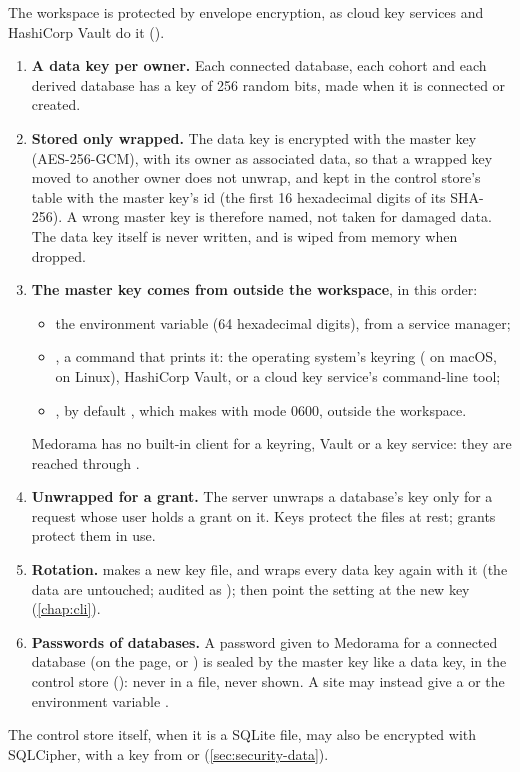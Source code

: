The workspace is protected by envelope encryption, as cloud key services and HashiCorp Vault do it
().
\begin{enumerate}
\item \textbf{A data key per owner.} Each connected database, each cohort and each derived
  database has a key of 256 random bits, made when it is connected or created.
\item \textbf{Stored only wrapped.} The data key is encrypted with the master key (AES-256-GCM),
  with its owner as associated data, so that a wrapped key moved to another owner does not
  unwrap, and kept in the control store's  table with the master key's id (the first 16
  hexadecimal digits of its SHA-256). A wrong master key is therefore named, not taken for
  damaged data. The data key itself is never written, and is wiped from memory when dropped.
\item \textbf{The master key comes from outside the workspace}, in this order:
  \begin{itemize}
  \item the environment variable  (64 hexadecimal digits), from a
    service manager;
  \item {}, a command that prints it: the operating system's keyring
    ( on macOS,  on
    Linux), HashiCorp Vault, or a cloud key service's command-line tool;
  \item {}, by default , which 
    makes with mode 0600, outside the workspace.
  \end{itemize}
  Medorama has no built-in client for a keyring, Vault or a key service: they are reached through
  .
\item \textbf{Unwrapped for a grant.} The server unwraps a database's key only for a request whose
  user holds a grant on it. Keys protect the files at rest; grants protect them in use.
\item \textbf{Rotation.}  makes a new key file, and  wraps every data key again with it (the data are untouched;
  audited as ); then point the setting at the new key (\cref{chap:cli}).
\item \textbf{Passwords of databases.} A password given to Medorama for a connected database (on
  the page, or ) is sealed by the master key
  like a data key, in the control store (): never in a file, never shown.
  A site may instead give a  or the environment variable
  .
\end{enumerate}
The control store itself, when it is a SQLite file, may also be encrypted with SQLCipher, with a
key from  or  (\cref{sec:security-data}).

